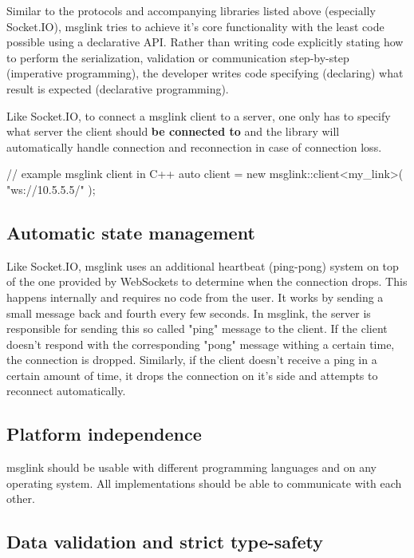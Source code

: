\documentclass[conference]{IEEEtran}
\begin{document}
Similar to the protocols and accompanying libraries listed above (especially Socket.IO), msglink tries to achieve it's core functionality with the least code possible using a declarative API. Rather than writing code explicitly stating how to perform the serialization, validation or communication step-by-step (imperative programming), the developer writes code specifying (declaring) what result is expected (declarative programming). \cite{imperative-vs-declarative}

Like Socket.IO, to connect a msglink client to a server, one only has to specify what server the client should \textbf{be connected to} and the library will automatically handle connection and reconnection in case of connection loss. 

\begin{code-cpp}
// example msglink client in C++
auto client = new msglink::client<my_link>(
    "ws://10.5.5.5/"
);
\end{code-cpp}

\subsection{Automatic state management}

Like Socket.IO, msglink uses an additional heartbeat (ping-pong) system on top of the one provided by WebSockets to determine when the connection drops. This happens internally and requires no code from the user. It works by sending a small message back and fourth every few seconds. In msglink, the server is responsible for sending this so called "ping" message to the client. If the client doesn't respond with the corresponding "pong" message withing a certain time, the connection is dropped. Similarly, if the client doesn't receive a ping in a certain amount of time, it drops the connection on it's side and attempts to reconnect automatically.


\subsection{Platform independence}

msglink should be usable with different programming languages and on any operating system. All implementations should be able to communicate with each other.


\subsection{Data validation and strict type-safety}
\end{document}
